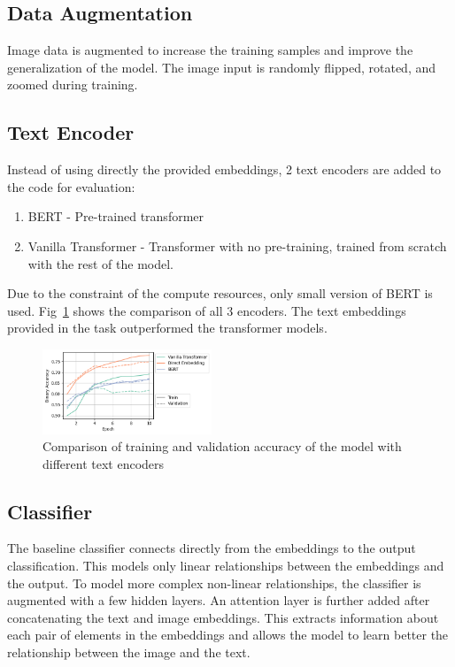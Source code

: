 \documentclass[conference]{IEEEtran}
\begin{document}
\subsection{Data Augmentation}

Image data is augmented to increase the training samples and improve the generalization of the model. The image input is randomly flipped, rotated, and zoomed during training.

\subsection{Text Encoder}

Instead of using directly the provided embeddings, 2 text encoders are added to the code for evaluation:

\begin{enumerate}
    \item BERT - Pre-trained transformer
    \item Vanilla Transformer - Transformer with no pre-training, trained from scratch with the rest of the model.
\end{enumerate}

Due to the constraint of the compute resources, only small version of BERT is used. Fig~\ref{fig:text_encoder_comparison} shows the comparison of all 3 encoders. The text embeddings provided in the task outperformed the transformer models.

\begin{figure}
    \centering
    \includegraphics[width=0.45\textwidth]{text_encoder_comparison.png}
    \caption{Comparison of training and validation accuracy of the model with different text encoders}
    \label{fig:text_encoder_comparison}
\end{figure}

\subsection{Classifier}

The baseline classifier connects directly from the embeddings to the output classification. This models only linear relationships between the embeddings and the output. To model more complex non-linear relationships, the classifier is augmented with a few hidden layers. An attention layer is further added after concatenating the text and image embeddings. This extracts information about each pair of elements in the embeddings and allows the model to learn better the relationship between the image and the text.
\end{document}
